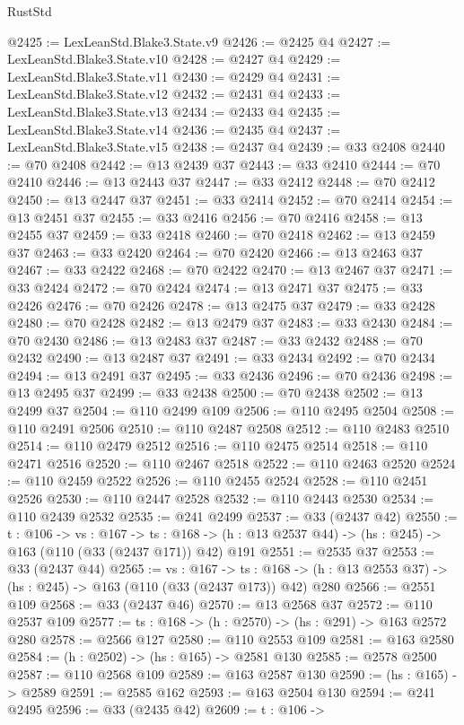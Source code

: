 \begin{lexlean}{RustStd}
\begin{coremodule}
@2425 := LexLeanStd.Blake3.State.v9
@2426 := @2425 @4
@2427 := LexLeanStd.Blake3.State.v10
@2428 := @2427 @4
@2429 := LexLeanStd.Blake3.State.v11
@2430 := @2429 @4
@2431 := LexLeanStd.Blake3.State.v12
@2432 := @2431 @4
@2433 := LexLeanStd.Blake3.State.v13
@2434 := @2433 @4
@2435 := LexLeanStd.Blake3.State.v14
@2436 := @2435 @4
@2437 := LexLeanStd.Blake3.State.v15
@2438 := @2437 @4
@2439 := @33 @2408
@2440 := @70 @2408
@2442 := @13 @2439 @37
@2443 := @33 @2410
@2444 := @70 @2410
@2446 := @13 @2443 @37
@2447 := @33 @2412
@2448 := @70 @2412
@2450 := @13 @2447 @37
@2451 := @33 @2414
@2452 := @70 @2414
@2454 := @13 @2451 @37
@2455 := @33 @2416
@2456 := @70 @2416
@2458 := @13 @2455 @37
@2459 := @33 @2418
@2460 := @70 @2418
@2462 := @13 @2459 @37
@2463 := @33 @2420
@2464 := @70 @2420
@2466 := @13 @2463 @37
@2467 := @33 @2422
@2468 := @70 @2422
@2470 := @13 @2467 @37
@2471 := @33 @2424
@2472 := @70 @2424
@2474 := @13 @2471 @37
@2475 := @33 @2426
@2476 := @70 @2426
@2478 := @13 @2475 @37
@2479 := @33 @2428
@2480 := @70 @2428
@2482 := @13 @2479 @37
@2483 := @33 @2430
@2484 := @70 @2430
@2486 := @13 @2483 @37
@2487 := @33 @2432
@2488 := @70 @2432
@2490 := @13 @2487 @37
@2491 := @33 @2434
@2492 := @70 @2434
@2494 := @13 @2491 @37
@2495 := @33 @2436
@2496 := @70 @2436
@2498 := @13 @2495 @37
@2499 := @33 @2438
@2500 := @70 @2438
@2502 := @13 @2499 @37
@2504 := @110 @2499 @109
@2506 := @110 @2495 @2504
@2508 := @110 @2491 @2506
@2510 := @110 @2487 @2508
@2512 := @110 @2483 @2510
@2514 := @110 @2479 @2512
@2516 := @110 @2475 @2514
@2518 := @110 @2471 @2516
@2520 := @110 @2467 @2518
@2522 := @110 @2463 @2520
@2524 := @110 @2459 @2522
@2526 := @110 @2455 @2524
@2528 := @110 @2451 @2526
@2530 := @110 @2447 @2528
@2532 := @110 @2443 @2530
@2534 := @110 @2439 @2532
@2535 := @241 @2499
@2537 := @33 (@2437 @42)
@2550 := {t : @106} ->
  {vs : @167} ->
  {ts : @168} -> (h : @13 @2537 @44) -> (hs : @245) -> @163 (@110 (@33 (@2437 @171)) @42) @191
@2551 := @2535 @37
@2553 := @33 (@2437 @44)
@2565 := {vs : @167} ->
  {ts : @168} -> (h : @13 @2553 @37) -> (hs : @245) -> @163 (@110 (@33 (@2437 @173)) @42) @280
@2566 := @2551 @109
@2568 := @33 (@2437 @46)
@2570 := @13 @2568 @37
@2572 := @110 @2537 @109
@2577 := {ts : @168} -> (h : @2570) -> (hs : @291) -> @163 @2572 @280
@2578 := @2566 @127
@2580 := @110 @2553 @109
@2581 := @163 @2580
@2584 := (h : @2502) -> (hs : @165) -> @2581 @130
@2585 := @2578 @2500
@2587 := @110 @2568 @109
@2589 := @163 @2587 @130
@2590 := (hs : @165) -> @2589
@2591 := @2585 @162
@2593 := @163 @2504 @130
@2594 := @241 @2495
@2596 := @33 (@2435 @42)
@2609 := {t : @106} ->

\end{coremodule}
\end{lexlean}
